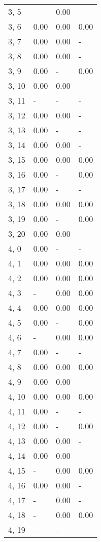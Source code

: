 \begin{table}
\begin{tabular}{llll}
3, 5   &     - &  0.00 &     - \\
3, 6   &  0.00 &  0.00 &  0.00 \\
3, 7   &  0.00 &  0.00 &     - \\
3, 8   &  0.00 &  0.00 &     - \\
3, 9   &  0.00 &     - &  0.00 \\
3, 10  &  0.00 &  0.00 &     - \\
3, 11  &     - &     - &     - \\
3, 12  &  0.00 &  0.00 &     - \\
3, 13  &  0.00 &     - &     - \\
3, 14  &  0.00 &  0.00 &     - \\
3, 15  &  0.00 &  0.00 &  0.00 \\
3, 16  &  0.00 &     - &  0.00 \\
3, 17  &  0.00 &     - &     - \\
3, 18  &  0.00 &  0.00 &  0.00 \\
3, 19  &  0.00 &     - &  0.00 \\
3, 20  &  0.00 &  0.00 &     - \\
4, 0   &  0.00 &     - &     - \\
4, 1   &  0.00 &  0.00 &  0.00 \\
4, 2   &  0.00 &  0.00 &  0.00 \\
4, 3   &     - &  0.00 &  0.00 \\
4, 4   &  0.00 &  0.00 &  0.00 \\
4, 5   &  0.00 &     - &  0.00 \\
4, 6   &     - &  0.00 &  0.00 \\
4, 7   &  0.00 &     - &     - \\
4, 8   &  0.00 &  0.00 &  0.00 \\
4, 9   &  0.00 &  0.00 &     - \\
4, 10  &  0.00 &  0.00 &  0.00 \\
4, 11  &  0.00 &     - &     - \\
4, 12  &  0.00 &     - &  0.00 \\
4, 13  &  0.00 &  0.00 &     - \\
4, 14  &  0.00 &  0.00 &     - \\
4, 15  &     - &  0.00 &  0.00 \\
4, 16  &  0.00 &  0.00 &     - \\
4, 17  &     - &  0.00 &     - \\
4, 18  &     - &  0.00 &  0.00 \\
4, 19  &     - &     - &     - \\

\end{tabular}
\end{table}
